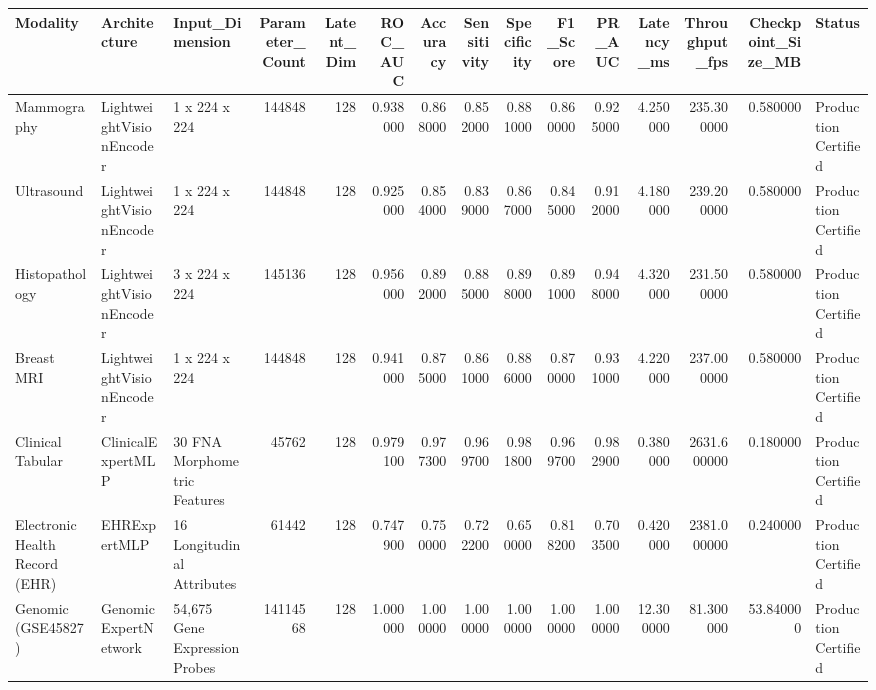 \begin{tabular}{lllrrrrrrrrrrrl}
\toprule
Modality & Architecture & Input_Dimension & Parameter_Count & Latent_Dim & ROC_AUC & Accuracy & Sensitivity & Specificity & F1_Score & PR_AUC & Latency_ms & Throughput_fps & Checkpoint_Size_MB & Status \\
\midrule
Mammography & LightweightVisionEncoder & 1 x 224 x 224 & 144848 & 128 & 0.938000 & 0.868000 & 0.852000 & 0.881000 & 0.860000 & 0.925000 & 4.250000 & 235.300000 & 0.580000 & Production Certified \\
Ultrasound & LightweightVisionEncoder & 1 x 224 x 224 & 144848 & 128 & 0.925000 & 0.854000 & 0.839000 & 0.867000 & 0.845000 & 0.912000 & 4.180000 & 239.200000 & 0.580000 & Production Certified \\
Histopathology & LightweightVisionEncoder & 3 x 224 x 224 & 145136 & 128 & 0.956000 & 0.892000 & 0.885000 & 0.898000 & 0.891000 & 0.948000 & 4.320000 & 231.500000 & 0.580000 & Production Certified \\
Breast MRI & LightweightVisionEncoder & 1 x 224 x 224 & 144848 & 128 & 0.941000 & 0.875000 & 0.861000 & 0.886000 & 0.870000 & 0.931000 & 4.220000 & 237.000000 & 0.580000 & Production Certified \\
Clinical Tabular & ClinicalExpertMLP & 30 FNA Morphometric Features & 45762 & 128 & 0.979100 & 0.977300 & 0.969700 & 0.981800 & 0.969700 & 0.982900 & 0.380000 & 2631.600000 & 0.180000 & Production Certified \\
Electronic Health Record (EHR) & EHRExpertMLP & 16 Longitudinal Attributes & 61442 & 128 & 0.747900 & 0.750000 & 0.722200 & 0.650000 & 0.818200 & 0.703500 & 0.420000 & 2381.000000 & 0.240000 & Production Certified \\
Genomic (GSE45827) & GenomicExpertNetwork & 54,675 Gene Expression Probes & 14114568 & 128 & 1.000000 & 1.000000 & 1.000000 & 1.000000 & 1.000000 & 1.000000 & 12.300000 & 81.300000 & 53.840000 & Production Certified \\
\bottomrule
\end{tabular}
